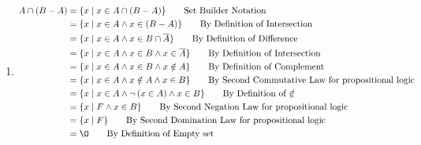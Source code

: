 \documentclass[12pt letter]{report}
\begin{document}
{{\begin{enumerate}
      \item
            \begin{align*}
              A \cap  \left( B - A \right) & = \{x  \mid x \in A \cap \left( B - A \right) \} \tag*{Set Builder Notation}                               \\
                                           & = \{x  \mid x \in A \wedge  x \in \left( B - A \right) \} \tag*{By Definition of Intersection}             \\
                                           & = \{x  \mid x \in A \wedge x \in B \cap  \overline{A}\} \tag*{By Definition of Difference}                 \\
                                           & = \{x  \mid x \in A \wedge x \in B \wedge x \in \overline{A}\} \tag*{By Definition of Intersection}        \\
                                           & = \{x  \mid x \in A \wedge x \in B \wedge x \notin A\} \tag*{By Definition of Complement}                  \\
                                           & = \{x  \mid x \in A \wedge x \notin A \wedge  x \in B\} \tag*{By Second Commutative Law for propositional
              logic}                                                                                                                                    \\
                                           & = \{x  \mid x \in A \wedge \neg \left( x \in A \right) \wedge  x \in B \} \tag*{By Definition of $\notin$} \\
                                           & = \{x  \mid F \wedge  x \in B\} \tag*{By Second Negation Law for
              propositional logic}                                                                                                                      \\
                                           & = \{x  \mid F\} \tag*{By Second Domination Law for propositional logic}                                    \\
                                           & = \O \tag*{By Definition of Empty set}                                                                     \\
            \end{align*}
    \end{enumerate}
  }
}
\end{document}
